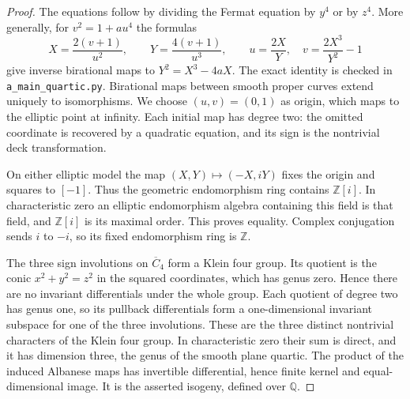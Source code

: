 \begin{proof}
The equations follow by dividing the Fermat equation by $y^4$ or by
$z^4$. More generally, for $v^2=1+a u^4$ the formulas
\[
 X=\frac{2(v+1)}{u^2},\qquad
 Y=\frac{4(v+1)}{u^3},\qquad
 u=\frac{2X}{Y},\quad v=\frac{2X^3}{Y^2}-1
\]
give inverse birational maps to $Y^2=X^3-4aX$. The exact identity is
checked in \texttt{a\_main\_quartic.py}. Birational maps between smooth
proper curves extend uniquely to isomorphisms. We choose $(u,v)=(0,1)$
as origin, which maps to the elliptic point at infinity. Each initial
map has degree two: the omitted coordinate is recovered by a quadratic
equation, and its sign is the nontrivial deck transformation.

On either elliptic model the map $(X,Y)\mapsto(-X,iY)$ fixes the origin
and squares to $[-1]$. Thus the geometric endomorphism ring contains
$\mathbb Z[i]$. In characteristic zero an elliptic endomorphism algebra
containing this field is that field, and $\mathbb Z[i]$ is its maximal
order. This proves equality. Complex conjugation sends $i$ to $-i$,
so its fixed endomorphism ring is $\mathbb Z$.

The three sign involutions on $\overline C_4$ form a Klein four group.
Its quotient is the conic $x^2+y^2=z^2$ in the squared coordinates,
which has genus zero. Hence there are no invariant differentials under
the whole group. Each quotient of degree two has genus one, so its
pullback differentials form a one-dimensional invariant subspace for
one of the three involutions. These are the three distinct nontrivial
characters of the Klein four group. In characteristic zero their sum
is direct, and it has dimension three, the genus of the smooth plane
quartic. The product of the induced Albanese maps has invertible
differential, hence finite kernel and equal-dimensional image. It is
the asserted isogeny, defined over $\mathbb Q$.
\end{proof}

